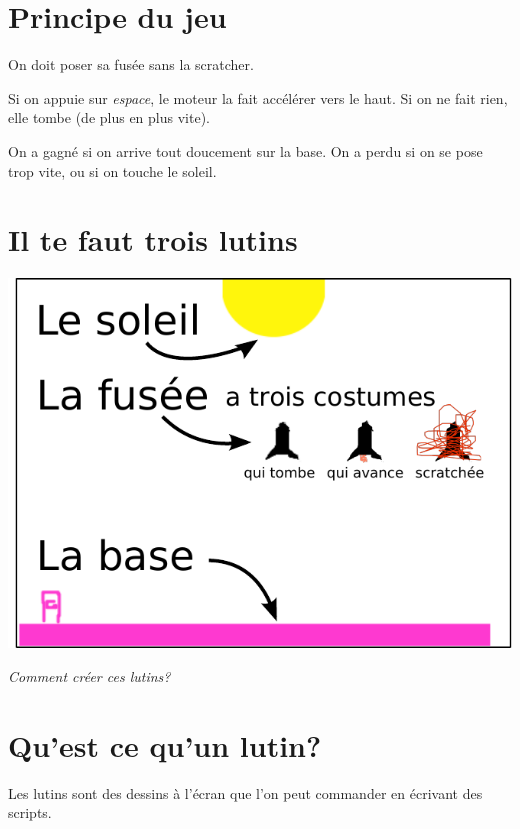 \documentclass[a7paper,pagesize,DIV=14,10pt]{scrbook}
\begin{document}
\newpage 
\section*{Principe du jeu}

\vspace{-.5\baselineskip}
On doit poser sa fusée sans la scratcher.

Si on appuie sur \textit{espace}, le moteur la fait accélérer vers le haut.
%
Si on ne fait rien, elle tombe (de plus en plus vite). 

On a gagné si on arrive tout doucement sur la base. On a perdu si on se pose
trop vite, ou si on touche le soleil.

\vspace{-.5\baselineskip}
\section*{Il te faut trois lutins}
\vspace{-.5\baselineskip}
\centerline{\includegraphics[width=.8\linewidth]{img/fusee_lutins.pdf}}

\bigskip
\centerline{\it Comment créer ces lutins?}

\newpage
\section*{Qu'est ce qu'un lutin?}
Les lutins sont des dessins à l'écran que l'on peut commander en écrivant des
scripts.
\medskip
\end{document}
